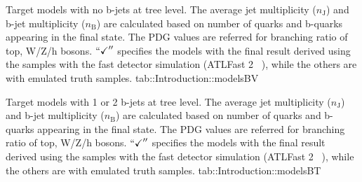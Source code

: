 
{Target models with no b-jets at tree level. The average jet multiplicity ($n_{\mathrm{J}}$) and b-jet multiplicity ($n_{\mathrm{B}}$) are calculated based on number of quarks and b-quarks appearing in the final state. The PDG values \cite{PDG2016} are referred for branching ratio of top, W/Z/h bosons. $``\checkmark''$ specifies the models with the final result derived using the samples with the fast detector simulation (ATLFast 2 ~\cite{atlfast}), while the others are with emulated truth samples.}
{tab::Introduction::modelsBV}



{Target models with 1 or 2 b-jets at tree level. The average jet multiplicity ($n_{\mathrm{J}}$) and b-jet multiplicity ($n_{\mathrm{B}}$) are calculated based on number of quarks and b-quarks appearing in the final state. The PDG values \cite{PDG2016} are referred for branching ratio of top, W/Z/h bosons. $``\checkmark''$ specifies the models with the final result derived using the samples with the fast detector simulation (ATLFast 2 ~\cite{atlfast}), while the others are with emulated truth samples.}
{tab::Introduction::modelsBT}



